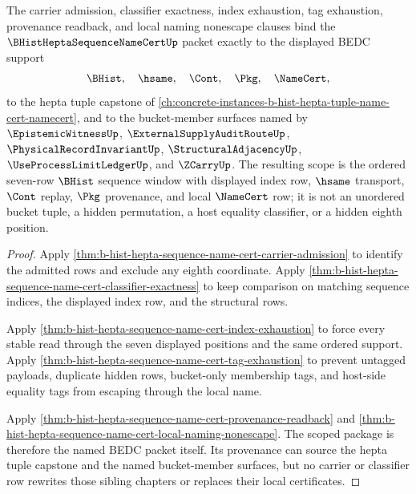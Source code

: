 \begin{theorem}
\label{thm:b-hist-hepta-sequence-name-cert-scoped-support-package}
The carrier admission, classifier exactness, index exhaustion, tag exhaustion, provenance readback, and local naming nonescape clauses bind the $\BHistHeptaSequenceNameCertUp$ packet exactly to the displayed BEDC support
$$
\BHist,\quad \hsame,\quad \Cont,\quad \Pkg,\quad \NameCert,
$$
to the hepta tuple capstone of \autoref{ch:concrete-instances-b-hist-hepta-tuple-name-cert-namecert}, and to the bucket-member surfaces named by $\EpistemicWitnessUp$, $\ExternalSupplyAuditRouteUp$, $\PhysicalRecordInvariantUp$, $\StructuralAdjacencyUp$, $\UseProcessLimitLedgerUp$, and $\ZCarryUp$. The resulting scope is the ordered seven-row $\BHist$ sequence window with displayed index row, $\hsame$ transport, $\Cont$ replay, $\Pkg$ provenance, and local $\NameCert$ row; it is not an unordered bucket tuple, a hidden permutation, a host equality classifier, or a hidden eighth position.
\end{theorem}
\begin{proof}
Apply \autoref{thm:b-hist-hepta-sequence-name-cert-carrier-admission} to identify the admitted rows and exclude any eighth coordinate. Apply \autoref{thm:b-hist-hepta-sequence-name-cert-classifier-exactness} to keep comparison on matching sequence indices, the displayed index row, and the structural rows.

Apply \autoref{thm:b-hist-hepta-sequence-name-cert-index-exhaustion} to force every stable read through the seven displayed positions and the same ordered support. Apply \autoref{thm:b-hist-hepta-sequence-name-cert-tag-exhaustion} to prevent untagged payloads, duplicate hidden rows, bucket-only membership tags, and host-side equality tags from escaping through the local name.

Apply \autoref{thm:b-hist-hepta-sequence-name-cert-provenance-readback} and \autoref{thm:b-hist-hepta-sequence-name-cert-local-naming-nonescape}. The scoped package is therefore the named BEDC packet itself. Its provenance can source the hepta tuple capstone and the named bucket-member surfaces, but no carrier or classifier row rewrites those sibling chapters or replaces their local certificates.
\end{proof}


